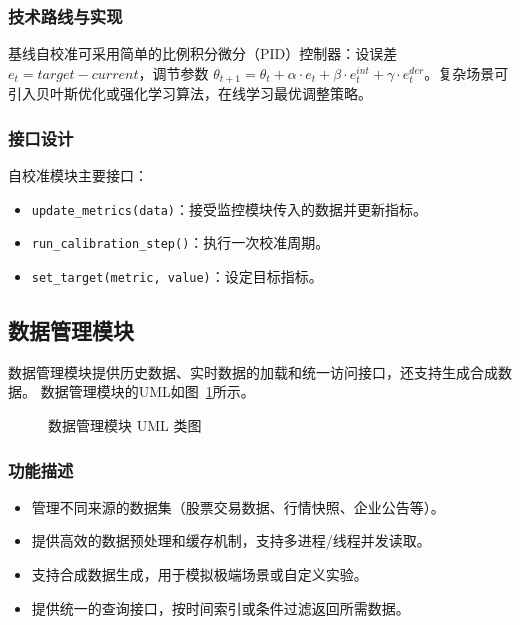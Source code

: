 \subsubsection{技术路线与实现}
基线自校准可采用简单的比例积分微分（PID）控制器：设误差$ e_t = target - current $，调节参数 $ \theta_{t+1} = \theta_t + \alpha\cdot e_t + \beta\cdot e_t^{int} + \gamma\cdot e_t^{der} $。复杂场景可引入贝叶斯优化或强化学习算法，在线学习最优调整策略。

\subsubsection{接口设计}
自校准模块主要接口：
\begin{itemize}
  \item \verb|update_metrics(data)|：接受监控模块传入的数据并更新指标。
  \item \verb|run_calibration_step()|：执行一次校准周期。
  \item \verb|set_target(metric, value)|：设定目标指标。
\end{itemize}

\subsection{数据管理模块}

数据管理模块提供历史数据、实时数据的加载和统一访问接口，还支持生成合成数据。
数据管理模块的UML如图~\ref{fig:uml_data}所示。

\begin{figure}[htbp]
  \centering
  \resizebox{\linewidth}{!}{}
  \caption{数据管理模块 UML 类图}
  \label{fig:uml_data}
\end{figure}


\subsubsection{功能描述}
\begin{itemize}
  \item 管理不同来源的数据集（股票交易数据、行情快照、企业公告等）。
  \item 提供高效的数据预处理和缓存机制，支持多进程/线程并发读取。
  \item 支持合成数据生成，用于模拟极端场景或自定义实验。
  \item 提供统一的查询接口，按时间索引或条件过滤返回所需数据。
\end{itemize}

